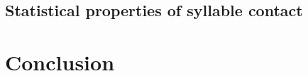 \documentclass{upenndiss}
\begin{document}
        \subsection{Statistical properties of syllable contact} 
    \section{Conclusion} %
\end{document}
